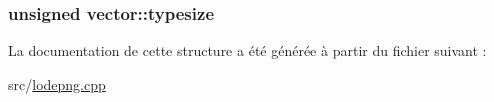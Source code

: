 \subsubsection[{typesize}]{\setlength{\rightskip}{0pt plus 5cm}unsigned vector\+::typesize}\label{structvector_aab0b37e2650659a664f4c993e6309d42}


La documentation de cette structure a été générée à partir du fichier suivant \+:\begin{DoxyCompactItemize}
\item 
src/\hyperlink{lodepng_8cpp}{lodepng.\+cpp}\end{DoxyCompactItemize}
